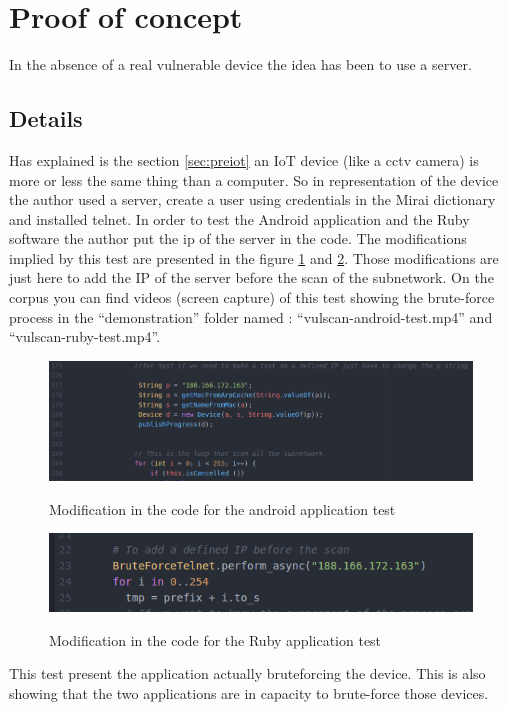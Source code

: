 \documentclass{report}
\begin{document}
\section{Proof of concept}
In the absence of a real vulnerable device the idea has been to use a server.

\subsection{Details}
Has explained is the section \ref{sec:preiot} an IoT device (like a cctv camera) is more or less the same thing than a computer. So in representation of the device the author used a server, create a user using credentials in the Mirai dictionary and installed telnet. In order to test the Android application and the Ruby software the author put the ip of the server in the code. The modifications implied by this test are presented in the figure \ref{fig:mod-and} and \ref{fig:mod-ruby}. Those modifications are just here to add the IP of the server before the scan of the subnetwork. On the corpus you can find videos (screen capture) of this test showing the brute-force process in the ``demonstration'' folder named : ``vulscan-android-test.mp4'' and ``vulscan-ruby-test.mp4''.
\begin{figure}[h]
 \caption{Modification in the code for the android application test}
 \centering
 \includegraphics[width=1.2\textwidth]{./img/exp/vulscan-android-test-modification}
 \label{fig:mod-and}
\end{figure}
\begin{figure}[h]
 \caption{Modification in the code for the Ruby application test}
 \centering
 \includegraphics[width=1.2\textwidth]{./img/exp/vulscan-ruby-test-modification}
 \label{fig:mod-ruby}
\end{figure}
This test present the application actually bruteforcing the device. This is also showing that the two applications are in capacity to brute-force those devices.
\end{document}
